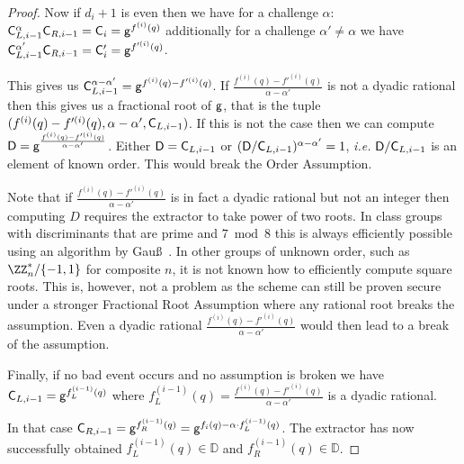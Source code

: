 \documentclass{article}
\theoremstyle{definition}
\begin{document}
\begin{proof}
Now if $d_i+1$ is even then we have for a challenge $\alpha$: $\mathsf{C}_{L,i-1}^\alpha \mathsf{C}_{R,i-1}=\mathsf{C}_i=\mathsf{g}^{f^{(i)}(q)}$ additionally for a challenge $\alpha'\neq \alpha$ we have $\mathsf{C}_{L,i-1}^{\alpha'} \mathsf{C}_{R,i-1}=\mathsf{C}'_i=\mathsf{g}^{f'^{(i)}(q)}$.  

 This gives us $\mathsf{C}_{L,i-1}^{\alpha-\alpha'}=\mathsf{g}^{f^{(i)}(q)-f'^{(i)}(q)}$. 
 If $\frac{f^{(i)}(q)-f'^{(i)}(q)}{\alpha-\alpha'}$ is not a dyadic rational then this gives us a fractional root of $\mathsf{g}$, that is the tuple $(f^{(i)}(q)-f'^{(i)}(q),\alpha-\alpha',\mathsf{C}_{L,i-1})$. If this is not the case then we can compute $\mathsf{D}=\mathsf{g}^{\frac{f^{(i)}(q)-f'^{(i)}(q)}{\alpha-\alpha'}}$. Either $\mathsf{D}=\mathsf{C}_{L,i-1}$ or $(\mathsf{D}/\mathsf{C}_{L,i-1})^{\alpha-\alpha'}=1$, \emph{i.e.} $\mathsf{D}/\mathsf{C}_{L,i-1}$ is an element of known order. This would break the Order Assumption.
 
Note that if $\frac{f^{(i)}(q)-f'^{(i)}(q)}{\alpha-\alpha'}$ is in fact a dyadic rational but not an integer then computing $D$ requires the extractor to take power of two roots. In class groups with discriminants that are prime and $7 \bmod 8$ this is always efficiently possible using an algorithm by Gauß~\cite{bosma1996computation}. In other groups of unknown order, such as $\ZZ_n^*/\{-1,1\}$ for composite $n$, it is not known how to efficiently compute square roots. This is, however, not a problem as the scheme can still be proven secure under a stronger Fractional Root Assumption where any rational root breaks the assumption. Even a dyadic rational $\frac{f^{(i)}(q)-f'^{(i)}(q)}{\alpha-\alpha'}$ would then lead to a break of the assumption.

Finally, if no bad event occurs and no assumption is broken we have $\mathsf{C}_{L,i-1}=\mathsf{g}^{f^{(i-1)}_L(q)}$ where $f^{(i-1)}_L(q)=\frac{f^{(i)}(q)-f'^{(i)}(q)}{\alpha-\alpha'}$ is a dyadic rational.  
 
 In that case $\mathsf{C}_{R,i-1}=\mathsf{g}^{f^{(i-1)}_R(q)}=\mathsf{g}^{f_{i}(q)-\alpha \cdot f^{(i-1)}_L(q)}$. The extractor has now successfully obtained $f^{(i-1)}_L(q)\in \mathbb{D}$ and $f^{(i-1)}_R(q)\in \mathbb{D}$.
 

\end{proof}
\end{document}
